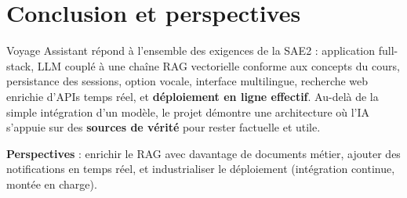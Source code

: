 \documentclass[11pt,a4paper]{article}
\begin{document}
\section{Conclusion et perspectives}

Voyage Assistant répond à l'ensemble des exigences de la SAE2 : application full-stack,
LLM couplé à une chaîne RAG vectorielle conforme aux concepts du cours, persistance des
sessions, option vocale, interface multilingue, recherche web enrichie d'APIs temps
réel, et \textbf{déploiement en ligne effectif}. Au-delà de la simple intégration d'un
modèle, le projet démontre une architecture où l'IA s'appuie sur des \textbf{sources de
vérité} pour rester factuelle et utile.

\textbf{Perspectives} : enrichir le RAG avec davantage de documents métier, ajouter des
notifications en temps réel, et industrialiser le déploiement (intégration continue,
montée en charge).
\end{document}
